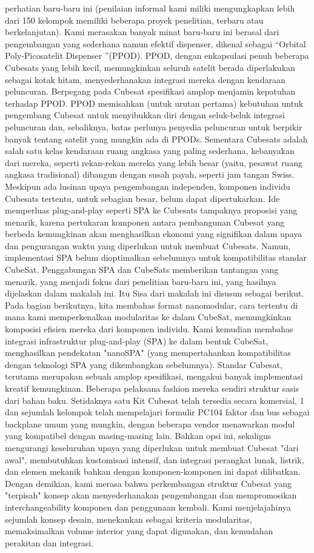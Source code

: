 perhatian baru-baru ini (penilaian informal kami miliki
mengungkapkan lebih dari 150 kelompok memiliki beberapa proyek penelitian,
terbaru atau berkelanjutan). Kami merasakan banyak minat baru-baru ini
berasal dari pengembangan yang sederhana namun efektif
dispenser, dikenal sebagai “Orbital Poly-Picosatelit
Dispenser ”(PPOD). PPOD, dengan enkapsulasi penuh
beberapa Cubesats yang lebih kecil, memungkinkan seluruh satelit berada
diperlakukan sebagai kotak hitam, menyederhanakan integrasi mereka
dengan kendaraan peluncuran. Berpegang pada Cubesat
spesifikasi amplop menjamin kepatuhan terhadap
PPOD. PPOD memisahkan (untuk urutan pertama) kebutuhan
untuk pengembang Cubesat untuk menyibukkan diri dengan
seluk-beluk integrasi peluncuran dan, sebaliknya, batas
perlunya penyedia peluncuran untuk berpikir banyak tentang
satelit yang mungkin ada di PPODs.
Sementara Cubesats adalah salah satu kelas kendaraan ruang angkasa yang paling sederhana, kebanyakan dari mereka, seperti rekan-rekan mereka yang lebih besar (yaitu, pesawat ruang angkasa tradisional) dibangun dengan susah payah, seperti jam tangan Swiss. Meskipun ada lusinan upaya pengembangan independen, komponen individu Cubesats tertentu, untuk sebagian besar, belum dapat dipertukarkan. Ide memperluas plug-and-play seperti SPA ke Cubesats tampaknya proposisi yang menarik, karena pertukaran komponen antara pembangunan Cubesat yang berbeda kemungkinan akan menghasilkan ekonomi yang signifikan dalam upaya dan pengurangan waktu yang diperlukan untuk membuat Cubesats. Namun, implementasi SPA belum dioptimalkan sebelumnya untuk kompatibilitas standar CubeSat. Penggabungan SPA dan CubeSats memberikan tantangan yang menarik, yang menjadi fokus dari penelitian baru-baru ini, yang hasilnya dijelaskan dalam makalah ini.
Itu Sisa dari makalah ini disusun sebagai berikut. Pada bagian berikutnya, kita membahas format nanomodular, cara tertentu di mana kami memperkenalkan modularitas ke dalam CubeSat, memungkinkan komposisi efisien mereka dari komponen individu. Kami kemudian membahas integrasi infrastruktur plug-and-play (SPA) ke dalam bentuk CubeSat, menghasilkan pendekatan "nanoSPA" (yang mempertahankan kompatibilitas dengan teknologi SPA yang dikembangkan sebelumnya). 
Standar Cubesat, terutama merupakan sebuah amplop spesifikasi, mengakui banyak implementasi kreatif kemungkinan. Beberapa pelaksana fashion mereka sendiri struktur sasis dari bahan baku. Setidaknya satu Kit Cubesat telah tersedia secara komersial, 1 dan sejumlah kelompok telah mempelajari formulir PC104 faktor dan bus sebagai backplane umum yang mungkin, dengan beberapa vendor menawarkan modul yang kompatibel dengan masing-masing lain. Bahkan opsi ini, sekaligus mengurangi keseluruhan upaya yang diperlukan untuk membuat Cubesat "dari awal", membutuhkan kustomisasi intensif, dan integrasi perangkat lunak, listrik, dan elemen mekanik bahkan dengan komponen-komponen ini dapat dilibatkan. Dengan demikian, kami merasa bahwa perkembangan struktur Cubesat yang "terpisah" konsep akan menyederhanakan pengembangan dan mempromosikan interchangeability komponen dan penggunaan kembali. Kami menjelajahinya sejumlah konsep desain, menekankan sebagai kriteria modularitas, memaksimalkan volume interior yang dapat digunakan, dan kemudahan perakitan dan integrasi.
